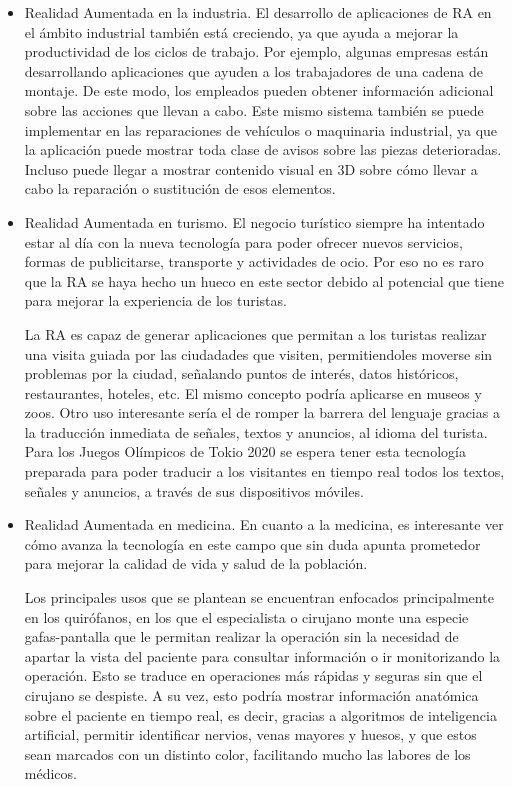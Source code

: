 \begin{itemize}
    
    
    \item Realidad Aumentada en la industria. El desarrollo de aplicaciones de RA en el ámbito industrial también está creciendo, ya que ayuda a mejorar la productividad de los ciclos de trabajo. Por ejemplo, algunas empresas están desarrollando aplicaciones que ayuden a los trabajadores de una cadena de montaje. De este modo, los empleados pueden obtener información adicional sobre las acciones que llevan a cabo. Este mismo sistema también se puede implementar en las reparaciones de vehículos o maquinaria industrial, ya que la aplicación puede mostrar toda clase de avisos sobre las piezas deterioradas. Incluso puede llegar a mostrar contenido visual en 3D sobre cómo llevar a cabo la reparación o sustitución de esos elementos. 
    

    \item Realidad Aumentada en turismo. El negocio turístico siempre ha intentado estar al día con la nueva tecnología para poder ofrecer nuevos servicios, formas de publicitarse, transporte y actividades de ocio. Por eso no es raro que la RA se haya hecho un hueco en este sector debido al potencial que tiene para mejorar la experiencia de los turistas. 
    
    La RA es capaz de generar aplicaciones que permitan a los turistas realizar una visita guiada por las ciudadades que visiten, permitiendoles moverse sin problemas por la ciudad, señalando puntos de interés, datos históricos, restaurantes, hoteles, etc. El mismo concepto podría aplicarse en museos y zoos. Otro uso interesante sería el de romper la barrera del lenguaje gracias a la traducción inmediata de señales, textos y anuncios, al idioma del turista. Para los Juegos Olímpicos de Tokio 2020 se espera tener esta tecnología preparada para poder traducir a los visitantes en tiempo real todos los textos, señales y anuncios, a través de sus dispositivos móviles.   

    

    \item Realidad Aumentada en medicina. En cuanto a la medicina, es interesante ver cómo avanza la tecnología en este campo que sin duda apunta prometedor para mejorar la calidad de vida y salud de la población.
    
    Los principales usos que se plantean se encuentran enfocados principalmente en los quirófanos, en los que el especialista o cirujano monte una especie gafas-pantalla que le permitan realizar la operación sin la necesidad de apartar la vista del paciente para consultar información o ir monitorizando la operación. Esto se traduce en operaciones más rápidas y seguras sin que el cirujano se despiste. A su vez, esto podría mostrar información anatómica sobre el paciente en tiempo real, es decir, gracias a algoritmos de inteligencia artificial, permitir identificar nervios, venas mayores y huesos, y que estos sean marcados con un distinto color, facilitando mucho las labores de los médicos.

\end{itemize}

